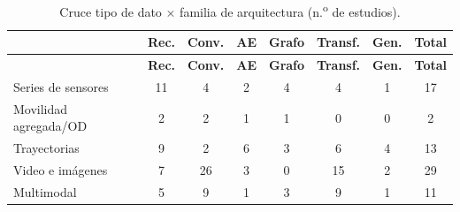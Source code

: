 \begingroup
\small
\begin{xltabular}{\linewidth}{Xccccccc}
\caption{Cruce tipo de dato $\times$ familia de arquitectura (n.\textsuperscript{o} de estudios).}\label{tab:cruce_dato}\\
\toprule
\textbf{} & \textbf{Rec.} & \textbf{Conv.} & \textbf{AE} & \textbf{Grafo} & \textbf{Transf.} & \textbf{Gen.} & \textbf{Total} \\
\midrule\endfirsthead
\toprule
\textbf{} & \textbf{Rec.} & \textbf{Conv.} & \textbf{AE} & \textbf{Grafo} & \textbf{Transf.} & \textbf{Gen.} & \textbf{Total} \\
\midrule\endhead
\bottomrule\endfoot
Series de sensores & 11 & 4 & 2 & 4 & 4 & 1 & 17 \\
Movilidad agregada/OD & 2 & 2 & 1 & 1 & 0 & 0 & 2 \\
Trayectorias & 9 & 2 & 6 & 3 & 6 & 4 & 13 \\
Video e im\'{a}genes & 7 & 26 & 3 & 0 & 15 & 2 & 29 \\
Multimodal & 5 & 9 & 1 & 3 & 9 & 1 & 11 \\
\end{xltabular}
\vspace{-6pt}{\footnotesize\raggedright Un estudio puede usar varias familias, por lo que las filas no suman el total.\par}
\endgroup
